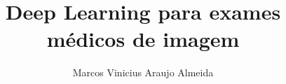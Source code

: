 \documentclass[msc,brazilian]{thesispuc}%
\author{Marcos Vinicius Araujo Almeida}
\title{Deep Learning para exames médicos de imagem} %
\begin{document}
   
   
  
  
  
  
  
  \arial
   
\end{document}
